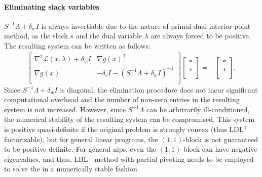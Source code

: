 \documentclass{article}
\begin{document}
\paragraph{Eliminating slack variables}
$S^{-1}\Lambda + \delta_w I$ is always invertiable due to the nature of primal-dual interior-point method, as the slack $s$ and the dual variable $\lambda$ are always forced to be positive. The resulting system can be written as follows:
\begin{align}\label{eqn:kkt_2}
  \begin{bmatrix}
    \nabla^2 \mathcal{L}(x,\lambda) + \delta_w I&  \nabla g(x)^\top \\
    \nabla g(x) &  - \delta_c I - (S^{-1}\Lambda + \delta_w I)^{-1}\\
  \end{bmatrix}
  \begin{bmatrix}
    *\\
    *\\
  \end{bmatrix} =
  -\begin{bmatrix}
    *\\
    *\\
  \end{bmatrix},  
\end{align}
Since $S^{-1}\Lambda + \delta_w I$ is diagonal, the elimination procedure does not incur significant computational overhead and the number of non-zero entries in the resulting system is not increased. However, since $S^{-1}\Lambda$ can be arbitrarily ill-conditioned, the numerical stability of the resulting system can be compromised. This system is positive quasi-definite if the original problem is strongly convex (thus LDL$^\top$ factorizable), but for general linear programs, the $(1,1)$-block is not guaranteed to be positive definite. For general \glspl*{nlp}, even the $(1,1)$-block can have negative eigenvalues, and thus, LBL$^\top$ method with partial pivoting needs to be employed to solve the in a numerically stable fashion.
\end{document}
